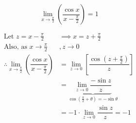 \documentclass[14pt,fleqn]{extarticle}
\begin{document}
 

\[ \lim_{x\to\frac\pi{2}}\left(\dfrac{\cos x}{x-\frac\pi{2}}\right) = 1 \]

\newcard 

\begin{align}
\text{Let }z = x-\frac\pi{2}&\implies x = z + \frac\pi{2} \\ 
\text{Also, as }x\to\frac\pi{2} &, z\to 0  \\
\therefore  \lim_{x\to\frac\pi{2}}\left(\dfrac{\cos x}{x-\frac\pi{2}}\right) &= 
\lim_{z\to 0}\left[\dfrac{\cos\left( z+\frac\pi{2}\right)}{z}\right] \\
&= \underbrace{\lim_{z\to 0}\dfrac{-\sin z}{z}}_{\cos\left(\frac\pi{2}+\theta\right) = -\sin\theta} \\
&= -1\cdot\lim_{z\to 0}\dfrac{\sin z}{z} = -1 
\end{align}
\end{document}
